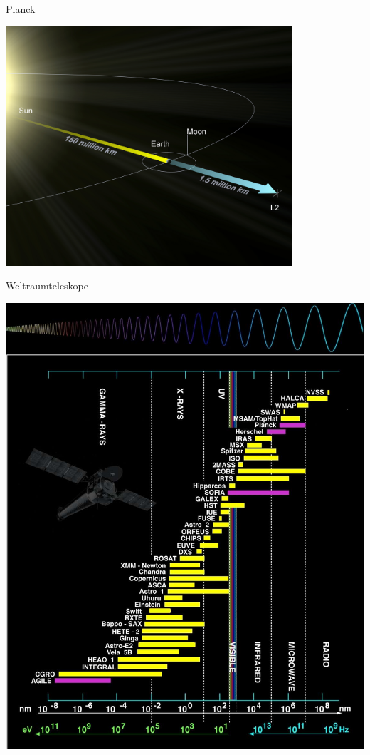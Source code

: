 \documentclass[14pt]{beamer}
\begin{document}
\begin{frame}{Planck}
	\begin{center}
		\includegraphics[width=0.8\textwidth]{L2_rendering.jpg}		
	\end{center}
\end{frame}

\begin{frame}{Weltraumteleskope}
	\begin{center}
	\includegraphics[height=0.8\textheight]{Space_telescopes.png}		
	\end{center}
\end{frame}
\end{document}
